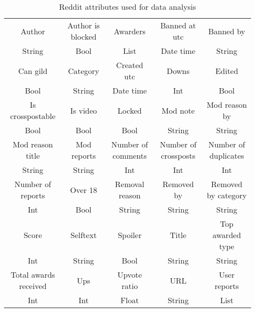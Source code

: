 \begin{landscape}
    \begin{center}
    \begin{table}
      \begin{tabular}{|c|c|c|c|c|}
        \hline
        Author & Author is blocked & Awarders & Banned at utc & Banned by \\
        String & Bool & List & Date time & String\\
        \hline
        Can gild & Category & \cellcolor{green} Created utc & Downs & Edited \\
        Bool & String & \cellcolor{green} Date time & Int & Bool \\
        \hline
        Is crosspostable & Is video & Locked & Mod note & Mod reason by \\
        Bool & Bool & Bool & String & String \\
        \hline
        Mod reason title & Mod reports & \cellcolor{green} Number of comments & \cellcolor{green} Number of crossposts & \cellcolor{green} Number of duplicates \\
        String & String & \cellcolor{green} Int & \cellcolor{green} Int & \cellcolor{green} Int \\
        \hline
        Number of reports & Over 18 & Removal reason & Removed by & Removed by category \\
        Int & Bool & String & String & String \\
        \hline
        Score & Selftext & Spoiler & Title & Top awarded type \\
        Int & String & Bool & String & String \\
        \hline
        \cellcolor{green} Total awards received & \cellcolor{green} Ups & Upvote ratio & URL & User reports \\
        \cellcolor{green} Int & \cellcolor{green} Int & Float & String & List \\
        \hline
      \end{tabular}
      \caption{Reddit attributes used for data analysis}
      \end{table}
    \end{center}
\end{landscape}

